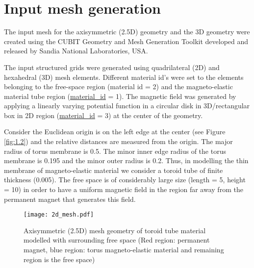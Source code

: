 \section{Input mesh generation}
The input mesh for the axisymmetric (2.5D) geometry and the 3D geometry were created using the CUBIT Geometry and Mesh Generation Toolkit \cite{cubit} developed and released by Sandia National Laboratories, USA. \par 

The input structured grids were generated using quadrilateral (2D) and hexahedral (3D) mesh elements. Different material id's were set to the elements belonging to the free-space region (material id = 2) and the magneto-elastic material tube region (\href{https://www.dealii.org/current/doxygen/deal.II/structCellData.html#a7d4a093cec27f2f8c947dd97d3aab290}{material\_id} = 1). The magnetic field was generated by applying a linearly varying potential function in a circular disk in 3D/rectangular box in 2D region (\href{https://www.dealii.org/current/doxygen/deal.II/structCellData.html#a7d4a093cec27f2f8c947dd97d3aab290}{material\_id} = 3) at the center of the geometry. \par 

Consider the Euclidean origin is on the left edge at the center (see Figure \eqref{fig:1.2}) and the relative distances are measured from the origin. The major radius of torus membrane is 0.5. The minor inner edge radius of the torus membrane is 0.195 and the minor outer radius is 0.2. Thus, in modelling the thin membrane of magneto-elastic material we consider a toroid tube of finite thickness (0.005). The free space is of considerably large size (length = 5, height = 10) in order to have a uniform magnetic field in the region far away from the permanent magnet that generates this field. \par 

\begin{figure}[h]
\centering
\texttt{[image: 2d\_mesh.pdf]}
\caption{Axisymmetric (2.5D) mesh geometry of toroid tube material modelled with surrounding free space (Red region: permanent magnet, blue region: torus magneto-elastic material and remaining region is the free space)}
\label{fig:1.2}
\end{figure}

